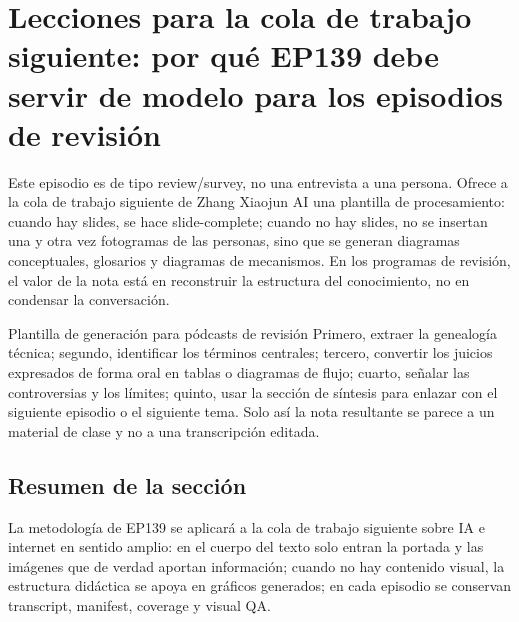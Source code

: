 \section{Lecciones para la cola de trabajo siguiente: por qué EP139 debe servir de modelo para los episodios de revisión}

Este episodio es de tipo review/survey, no una entrevista a una persona. Ofrece a la cola de trabajo siguiente de Zhang Xiaojun AI una plantilla de procesamiento: cuando hay slides, se hace slide-complete; cuando no hay slides, no se insertan una y otra vez fotogramas de las personas, sino que se generan diagramas conceptuales, glosarios y diagramas de mecanismos. En los programas de revisión, el valor de la nota está en reconstruir la estructura del conocimiento, no en condensar la conversación.

\begin{knowledgebox}{Plantilla de generación para pódcasts de revisión}
Primero, extraer la genealogía técnica; segundo, identificar los términos centrales; tercero, convertir los juicios expresados de forma oral en tablas o diagramas de flujo; cuarto, señalar las controversias y los límites; quinto, usar la sección de síntesis para enlazar con el siguiente episodio o el siguiente tema. Solo así la nota resultante se parece a un material de clase y no a una transcripción editada.
\end{knowledgebox}

\subsection{Resumen de la sección}

La metodología de EP139 se aplicará a la cola de trabajo siguiente sobre IA e internet en sentido amplio: en el cuerpo del texto solo entran la portada y las imágenes que de verdad aportan información; cuando no hay contenido visual, la estructura didáctica se apoya en gráficos generados; en cada episodio se conservan transcript, manifest, coverage y visual QA.


